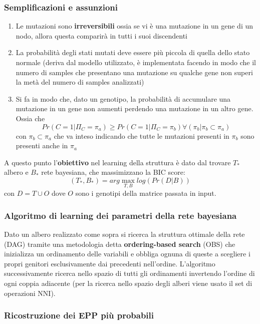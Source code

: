 \documentclass[a4paper]{article}
\begin{document}
	\subsubsection{Semplificazioni e assunzioni}

	\begin{enumerate}
	\item Le mutazioni sono \textbf{irreversibili} ossia se vi è una mutazione in un gene di un nodo, allora questa comparirà in tutti i suoi discendenti
	\item La probabilità degli stati mutati deve essere più piccola di quella dello stato normale (deriva dal modello utilizzato, è implementata facendo in modo che il numero
	di samples che presentano una mutazione su qualche gene non superi la metà del numero di samples analizzati)
	\item Si fa in modo che, dato un genotipo, la probabilità di accumulare una mutazione in un gene non aumenti perdendo una mutazione in un altro gene. Ossia che 
	$$Pr(C=1|\Pi_{C}=\pi_a)\ge Pr(C=1|\Pi_{C} =\pi_b)\forall (\pi_b | \pi_b\subset \pi_a)$$
	con $\pi_b \subset \pi_a$ che va inteso indicando che tutte le mutazioni presenti in $\pi_b$ sono presenti anche in $\pi_a$
	\end{enumerate}

	A questo punto l'\textbf{obiettivo} nel learning della struttura è dato dal trovare $T_*$ albero e $B_*$ rete bayesiana, che massimizzano la BIC score: 
	$$(T_*,B_*) = arg \max_{T,B}{log(Pr(D|B))}$$
	con $D = T \cup O$ dove $O$ sono i genotipi della matrice passata in input.

	\subsubsection{Algoritmo di learning dei parametri della rete bayesiana}

	Dato un albero realizzato come sopra si ricerca la struttura ottimale della rete (DAG) tramite una metodologia detta \textbf{ordering-based search} (OBS)
	che inizializza un ordinamento delle variabili e obbliga ognuna di queste a scegliere i propri genitori esclusivamente dai precedenti nell'ordine. 
	L'algoritmo successivamente ricerca nello spazio di tutti gli ordinamenti invertendo l'ordine di ogni coppia adiacente 
	(per la ricerca nello spazio degli alberi viene usato il set di operazioni NNI).

	\subsubsection{Ricostruzione dei EPP più probabili}  
\end{document}
